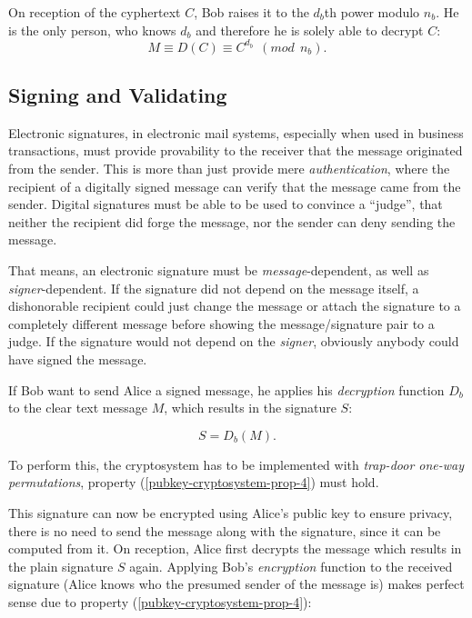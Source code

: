 On reception  of the cyphertext  $C$, Bob raises  it to the  $d_b$th power
modulo $n_b$. He  is the only person, who knows $d_b$  and therefore he is
solely able to decrypt $C$:
\begin{equation*}
  \label{eq:decrypt-message}
  M \equiv D(C) \equiv C^{d_b}\ \ (mod\ \ n_b).
\end{equation*}

\subsection{Signing and Validating}

Electronic  signatures, \eg in electronic  mail systems,  especially when
used in  business transactions, must  provide provability to  the receiver
that  the message  originated from  the sender.   This is  more  than just
provide  mere \emph{authentication},  where the  recipient of  a digitally
signed message can  verify that the message came  from the sender. Digital
signatures must be  able to be used to convince  a ``judge'', that neither
the recipient did  forge the message, nor the sender  can deny sending the
message.

That means,  an electronic signature must  be \emph{message}-dependent, as
well as  \emph{signer}-dependent. If the  signature did not depend  on the
message itself, a dishonorable recipient  could just change the message or
attach the signature to a  completely different message before showing the
message/signature pair  to a judge. If  the signature would  not depend on
the \emph{signer}, obviously anybody could have signed the message.

\medskip

If   Bob  want  to   send  Alice   a  signed   message,  he   applies  his
\emph{decryption}  function $D_b$  to the  clear text  message  $M$, which
results in the signature $S$:

\begin{equation*}
  \label{eq:compute-signature}
  S = D_b(M).
\end{equation*}

To   perform  this,   the  cryptosystem   has  to   be   implemented  with
\emph{trap-door         one-way        permutations},        \ie property
(\ref{pubkey-cryptosystem-prop-4}) must hold.

This signature  can now  be encrypted using  Alice's public key  to ensure
privacy, there  is no need to  send the message along  with the signature,
since it can  be computed from it. On reception,  Alice first decrypts the
message which  results in the  plain signature $S$ again.   Applying Bob's
\emph{encryption} function to the  received signature (Alice knows who the
presumed sender  of the  message is) makes  perfect sense due  to property
(\ref{pubkey-cryptosystem-prop-4}):

